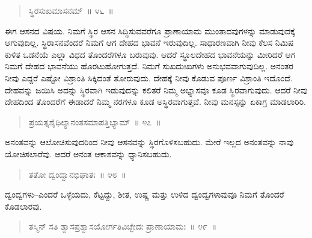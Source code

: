 \begin{verse}
ಸ್ಥಿರಸುಖಮಾಸನಮ್​~॥ ೪೬~॥
\end{verse}

\vspace{-0.35cm}



	
ಈಗ ಆಸನದ ವಿಷಯ. ನಿಮಗೆ ಸ್ಥಿರ ಆಸನ ಸಿದ್ಧಿಸುವವರೆಗೂ ಪ್ರಾಣಾಯಾಮ ಮುಂತಾದವುಗಳನ್ನು ಮಾಡುವುದಕ್ಕೆ ಆಗುವುದಿಲ್ಲ. ಸ್ಥಿರಾಸನವೆಂದರೆ ನಿಮಗೆ ಆಗ ದೇಹದ ಭಾವನೆ ಇರುವುದಿಲ್ಲ. ಸಾಧಾರಣವಾಗಿ ನೀವು ಕೆಲಸ ನಿಮಿಷ ಕುಳಿತ ಒಡನೆಯೆ ಎಲ್ಲಾ ವಿಧದ ತೊಂದರೆಗಳೂ ಬರುವುವು. ಆದರೆ ಸ್ಥೂಲದೇಹದ ಭಾವನೆಯನ್ನು ಮೀರಿದರೆ ಆಗ ನಿಮಗೆ ದೇಹದ ಭಾವನೆಯು ಹೊರಟುಹೋಗುತ್ತದೆ. ನಿಮಗೆ ಸುಖದುಃಖಗಳು ಅನುಭವವಾಗುವುದಿಲ್ಲ. ಅನಂತರ ನೀವು ಎದ್ದರೆ ಎಷ್ಟೋ ವಿಶ್ರಾಂತಿ ಸಿಕ್ಕಿದಂತೆ ತೋರುವುದು. ದೇಹಕ್ಕೆ ನೀವು ಕೊಡುವ ಪೂರ್ಣ ವಿಶ್ರಾಂತಿ ಇದೊಂದೆ. ದೇಹವನ್ನು ಜಯಿಸಿ ಅದನ್ನು ಸ್ಥಿರವಾಗಿ ಇಡುವುದನ್ನು ಕಲಿತರೆ ನಿಮ್ಮ ಅಭ್ಯಾಸವೂ ಕೂಡ ಸ್ಥಿರವಾಗುವುದು. ಆದರೆ ನೀವು ದೇಹದಿಂದ ತೊಂದರೆಗೆ ಈಡಾದರೆ ನಿಮ್ಮ ನರಗಳೂ ಕೂಡ ಅಸ್ಥಿರವಾಗುತ್ತವೆ. ನೀವು ಮನಸ್ಸನ್ನು ಏಕಾಗ್ರ ಮಾಡಲಾರಿರಿ. 

\vspace{-0.3cm}

\begin{verse}
ಪ್ರಯತ್ನಶೈಥಿಲ್ಯಾನಂತಸಮಾಪತ್ತಿಭ್ಯಾಮ್​~॥ ೪೭~॥
\end{verse}

\vspace{-0.3cm}


ಅನಂತವನ್ನು ಆಲೋಚಿಸುವುದರಿಂದ ನೀವು ಆಸನವನ್ನು ಸ್ಥಿರಗೊಳಿಸಬಹುದು. ಮೇರೆ ಇಲ್ಲದ ಅನಂತವನ್ನು ನಾವು ಯೋಚಿಸಲಾರೆವು. ಆದರೆ ಅನಂತ ಆಕಾಶವನ್ನು ಧ್ಯಾನಿಸಬಹುದು. 

\vspace{-0.3cm}

\begin{verse}
ತತೋ ದ್ವಂದ್ವಾನಭಿಘಾತಃ~॥ ೪೮~॥
\end{verse}

\vspace{-0.3cm}


ದ್ವಂದ್ವಗಳು–ಎಂದರೆ ಒಳ್ಳೆಯದು, ಕೆಟ್ಟದ್ದು, ಶೀತ, ಉಷ್ಣ ಮತ್ತು ಉಳಿದ ದ್ವಂದ್ವಗಳಾವುವೂ ನಿಮಗೆ ತೊಂದರೆ ಕೊಡಲಾರವು. 

\vspace{-0.3cm}

\begin{verse}
ತಸ್ಮಿನ್​ ಸತಿ ಶ್ವಾಸಪ್ರಶ್ವಾಸಯೋರ್ಗತಿವಿಚ್ಛೇದಃ ಪ್ರಾಣಾಯಾಮಃ~॥ ೪೯~॥
\end{verse}


